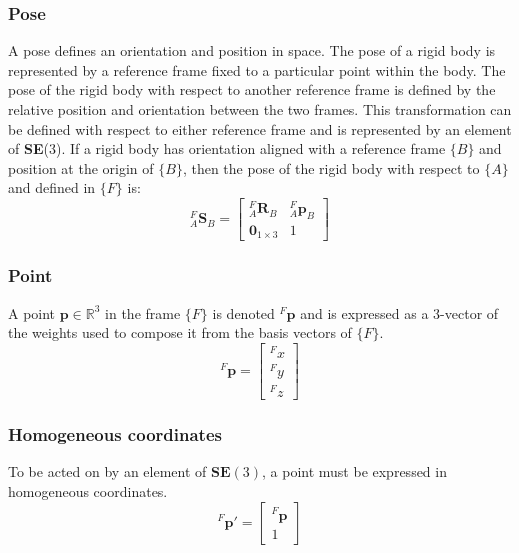 		\subsubsection{Pose}
		A pose defines an orientation and position in space. The pose of a rigid body is represented by a reference frame fixed to a particular point within the body. The pose of the rigid body with respect to another reference frame is defined by the relative position and orientation between the two frames. This transformation can be defined with respect to either reference frame and is represented by an element of \textbf{SE}(3). If a rigid body has orientation aligned with a reference frame $\{B\}$ and position at the origin of $\{B\}$, then the pose of the rigid body with respect to $\{A\}$ and defined in $\{F\}$ is:
		\begin{equation}
			{^{F}_{A}\mathbf{S}^{}_{B}} = 
			\begin{bmatrix}
				^{F}_{A}\mathbf{R}^{}_{B}	& 	^{F}_{A}\mathbf{p}^{}_{B}\\
				\textbf{0}_{1 \times 3} & 1						  
			\end{bmatrix}
		\end{equation}		
		
		\subsubsection{Point}
		A point $\mathbf{p} \in \mathbb{R}^3$ in the frame $\{F\}$ is denoted $^F\mathbf{p}$ and is expressed as a 3-vector of the weights used to compose it from the basis vectors of $\{F\}$.
		\begin{equation}
			^{F}\mathbf{p} = 
			\begin{bmatrix}
				^{F}x \\
				^{F}y \\
				^{F}z
			\end{bmatrix}
		\end{equation}
		
		\subsubsection{Homogeneous coordinates}
		To be acted on by an element of $\mathbf{SE}(3)$, a point must be expressed in homogeneous coordinates.
		\begin{equation}
			^{F}\mathbf{p'} = 
			\begin{bmatrix}
				^{F}\mathbf{p} \\
				1
			\end{bmatrix}
		\end{equation}
		
